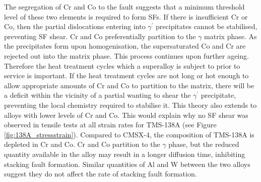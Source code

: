 \documentclass[a4paper,12pt,times,numbered,print,index]{Classes/PhDThesisPSnPDF}
\begin{document}
The segregation of Cr and Co to the fault suggests that a minimum threshold level of these two elements is required to form SFs. If there is insufficient Cr or Co, then the partial dislocations entering into $\gamma^{\prime}$ precipitates cannot be stabilised, preventing SF shear. Cr and Co preferentially partition to the $\gamma$ matrix phase.\cite{jarrett1982effects,tien1982effects,oni2016atom,llewelyn2017effect} As the precipitates form upon homogenisation, the supersaturated Co and Cr are rejected out into the matrix phase. This process continues upon further ageing. Therefore the heat treatment cycles which a superalloy is subject to prior to service is important. If the heat treatment cycles are not long or hot enough to allow appropriate amounts of Cr and Co to partition to the matrix, there will be a deficit within the vicinity of a partial wanting to shear the $\gamma^{\prime}$ precipitate, preventing the local chemistry required to stabilise it. This theory also extends to alloys with lower levels of Cr and Co. This would explain why no SF shear was observed in tensile tests at all strain rates for TMS-138A (see Figure \ref{fig:138A_stressstrain}). Compared to CMSX-4, the composition of TMS-138A is depleted in Cr and Co. Cr and Co partition to the $\gamma$ phase, but the reduced quantity available in the alloy may result in a longer diffusion time, inhibiting stacking fault formation. Similar quantities of Al and W between the two alloys suggest they do not affect the rate of stacking fault formation.\\
\end{document}
